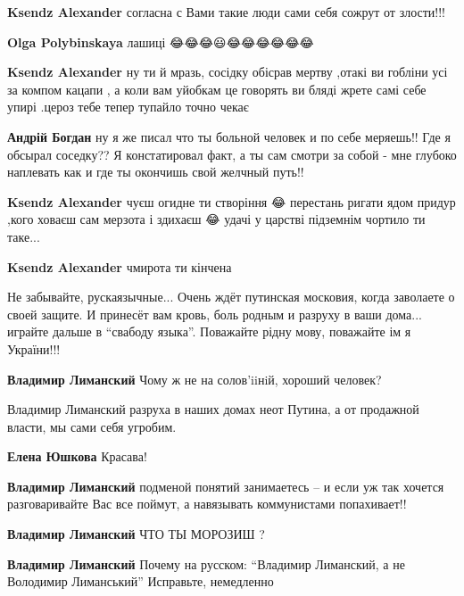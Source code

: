 \begin{itemize}
\textbf{Ksendz Alexander} согласна с Вами такие люди сами себя сожрут от злости!!!

\textbf{Olga Polybinskaya} лашиці \Laughey[1.0]\Laughey[1.0]\Laughey[1.0]😂😂😂😃😂😂😂😂😂😂

\textbf{Ksendz Alexander} ну ти й мразь, сосідку обісрав мертву ,отакі ви гобліни усі за компом кацапи , а коли вам уйобкам це говорять ви бляді жрете самі себе упирі .цероз тебе тепер тупайло точно чекає \Laughey[1.0]\Laughey[1.0]\Laughey[1.0]

\textbf{Андрій Богдан} ну я же писал что ты больной человек и по себе меряешь!! Где я обсырал соседку?? Я констатировал факт, а ты сам смотри за собой - мне глубоко наплевать как и где ты окончишь свой желчный путь!!

\textbf{Ksendz Alexander} чуєш огидне ти створіння 😂 перестань ригати ядом придур ,кого ховаєш сам мерзота і здихаєш 😂 удачі у царстві підземнім чортило ти таке...

\textbf{Ksendz Alexander} чмирота ти кінчена \Laughey[1.0]\Laughey[1.0]\Laughey[1.0]
\end{itemize}


Не забывайте, рускаязычные... Очень ждёт путинская московия, когда заволаете о
своей защите. И принесёт вам кровь, боль родным и разруху в ваши дома...
играйте дальше в \enquote{свабоду языка}. Поважайте рідну мову, поважайте ім я
України!!!

\begin{itemize}
\textbf{Владимир Лиманский} Чому ж не на солов'iiнiй, хороший человек?

Владимир Лиманский разруха в наших домах неот Путина, а от продажной власти, мы сами себя угробим.

\textbf{Елена Юшкова} Красава!

\textbf{Владимир Лиманский} подменой понятий занимаетесь -- и если уж так хочется разговаривайте Вас все поймут, а навязывать коммунистами попахивает!!

\textbf{Владимир Лиманский} ЧТО ТЫ МОРОЗИШ ?

\textbf{Владимир Лиманский}
Почему на русском: \enquote{Владимир Лиманский, а не Володимир Лиманський}
Исправьте, немедленно 
\end{itemize}

